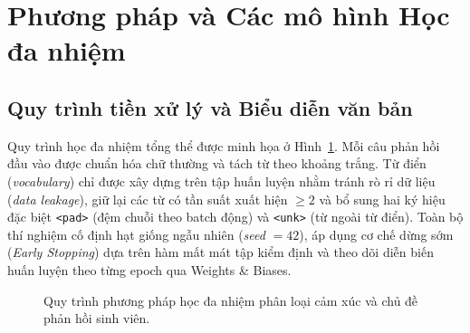 \documentclass[a4paper,12pt]{article}
\begin{document}
\section{Phương pháp và Các mô hình Học đa nhiệm}

\subsection{Quy trình tiền xử lý và Biểu diễn văn bản}
Quy trình học đa nhiệm tổng thể được minh họa ở Hình~\ref{fig:arch}. Mỗi câu phản hồi đầu vào được chuẩn hóa chữ thường và tách từ theo khoảng trắng. Từ điển (\textit{vocabulary}) chỉ được xây dựng trên tập huấn luyện nhằm tránh rò rỉ dữ liệu (\textit{data leakage}), giữ lại các từ có tần suất xuất hiện $\ge 2$ và bổ sung hai ký hiệu đặc biệt \texttt{<pad>} (đệm chuỗi theo batch động) và \texttt{<unk>} (từ ngoài từ điển). Toàn bộ thí nghiệm cố định hạt giống ngẫu nhiên (\textit{seed} $= 42$), áp dụng cơ chế dừng sớm (\textit{Early Stopping}) dựa trên hàm mất mát tập kiểm định và theo dõi diễn biến huấn luyện theo từng epoch qua Weights \& Biases.

\begin{figure}[H]
\centering
{}
\caption{Quy trình phương pháp học đa nhiệm phân loại cảm xúc và chủ đề phản hồi sinh viên.}
\label{fig:arch}
\end{figure}
\end{document}
